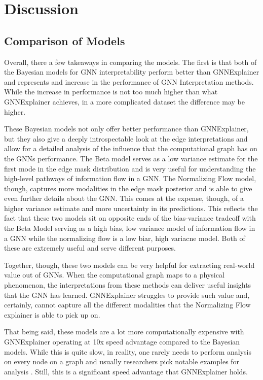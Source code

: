 \section{Discussion}

\subsection{Comparison of Models}
Overall, there a few takeaways in comparing the models. The first is that both of the Bayesian models for GNN interpretability perform better than GNNExplainer and represents and increase in the performance of GNN Interpretation methods. While the increase in performance is not too much higher than what GNNExplainer achieves, in a more complicated dataset the difference may be higher.

These Bayesian models not only offer better performance than GNNExplainer, but they also give a deeply introspectable look at the edge interpretations and allow for a detailed analysis of the influence that the computational graph has on the GNNs performance. The Beta model serves as a low variance estimate for the first mode in the edge mask distribution and is very useful for understanding the high-level pathways of information flow in a GNN. The Normalizing Flow model, though, captures more modalities in the edge mask posterior and is able to give even further details about the GNN. This comes at the expense, though, of a higher variance estimate and more uncertainty in its predictions. This reflects the fact that these two models sit on opposite ends of the bias-variance tradeoff with the Beta Model serving as a high bias, low variance model of information flow in a GNN while the normalizing flow is a low biar, high variacne model. Both of these are extremely useful and serve different purposes.

Together, though, these two models can be very helpful for extracting real-world value out of GNNs. When the computational graph maps to a physical phenomenon, the interpretations from these methods can deliver useful insights that the GNN has learned. GNNExplainer struggles to provide such value and, certainly, cannot capture all the different modalities that the Normalizing Flow explainer is able to pick up on.

That being said, these models are a lot more computationally expensive with GNNExplainer operating at 10x speed advantage compared to the Bayesian models. While this is quite slow, in reality, one rarely needs to perform analysis on every node on a graph and usually researchers pick notable examples for analysis \cite{bigness_integrating_2021}. Still, this is a significant speed advantage that GNNExplainer holds. 

